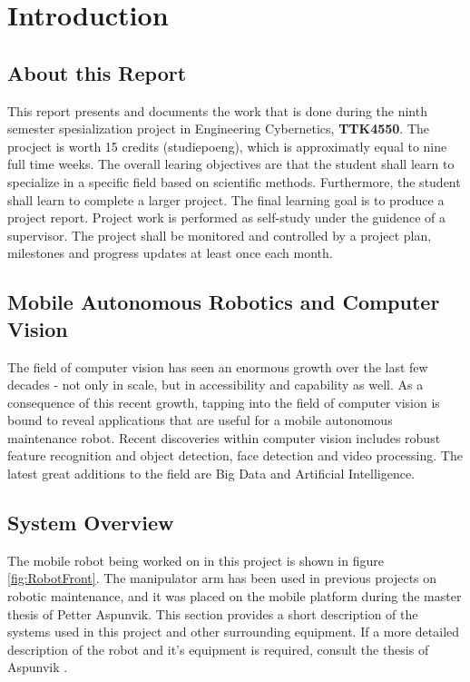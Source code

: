 \chapter{Introduction}
\label{chp:introduction} 

\section{About this Report}

This report presents and documents the work that is done during the ninth semester spesialization project in Engineering Cybernetics, \textbf{TTK4550}. The procject is worth 15 credits (studiepoeng), which is approximatly equal to nine full time weeks. The overall learing objectives are that the student shall learn to specialize in a specific field based on scientific methods. Furthermore, the student shall learn to complete a larger project. The final learning goal is to produce a project report. Project work is performed as self-study under the guidence of a supervisor. The project shall be monitored and controlled by a project plan, milestones and progress updates at least once each month.

\section{Mobile Autonomous Robotics and Computer Vision}

The field of computer vision has seen an enormous growth over the last few decades - not only in scale, but in accessibility and capability as well. As a consequence of this recent growth, tapping into the field of computer vision is bound to reveal applications that are useful for a mobile autonomous maintenance robot. Recent discoveries within computer vision includes robust feature recognition and object detection, face detection and video processing. The latest great additions to the field are Big Data and Artificial Intelligence.

\section{System Overview}

The mobile robot being worked on in this project is shown in figure \ref{fig:RobotFront}. The manipulator arm  has been used in previous projects on robotic maintenance, and it was placed on the mobile platform during the master thesis of Petter Aspunvik. This section provides a short description of the systems used in this project and other surrounding equipment. If a more detailed description of the robot and it's equipment is required, consult the thesis of Aspunvik \cite{aspunvik}.

